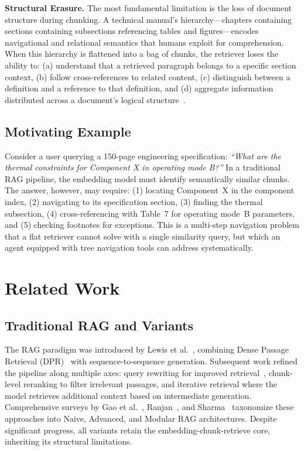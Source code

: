 \documentclass[conference]{IEEEtran}
\begin{document}
\textbf{Structural Erasure.} The most fundamental limitation is the loss of document structure during chunking. A technical manual's hierarchy---chapters containing sections containing subsections referencing tables and figures---encodes navigational and relational semantics that humans exploit for comprehension. When this hierarchy is flattened into a bag of chunks, the retriever loses the ability to: (a) understand that a retrieved paragraph belongs to a specific section context, (b) follow cross-references to related content, (c) distinguish between a definition and a reference to that definition, and (d) aggregate information distributed across a document's logical structure~\cite{multidocfusion2025}.

\subsection{Motivating Example}

Consider a user querying a 150-page engineering specification: \textit{``What are the thermal constraints for Component X in operating mode B?''} In a traditional RAG pipeline, the embedding model must identify semantically similar chunks. The answer, however, may require: (1) locating Component~X in the component index, (2) navigating to its specification section, (3) finding the thermal subsection, (4) cross-referencing with Table~7 for operating mode~B parameters, and (5) checking footnotes for exceptions. This is a multi-step navigation problem that a flat retriever cannot solve with a single similarity query, but which an agent equipped with tree navigation tools can address systematically.

\section{Related Work}

\subsection{Traditional RAG and Variants}

The RAG paradigm was introduced by Lewis et al.~\cite{lewis2020rag}, combining Dense Passage Retrieval (DPR)~\cite{karpukhin2020dpr} with sequence-to-sequence generation. Subsequent work refined the pipeline along multiple axes: query rewriting for improved retrieval~\cite{gao2024ragsurvey}, chunk-level reranking to filter irrelevant passages, and iterative retrieval where the model retrieves additional context based on intermediate generation. Comprehensive surveys by Gao et al.~\cite{gao2024ragsurvey}, Ranjan~\cite{ranjan2024ragsurvey}, and Sharma~\cite{sharma2025ragsurvey} taxonomize these approaches into Naive, Advanced, and Modular RAG architectures. Despite significant progress, all variants retain the embedding-chunk-retrieve core, inheriting its structural limitations.
\end{document}
